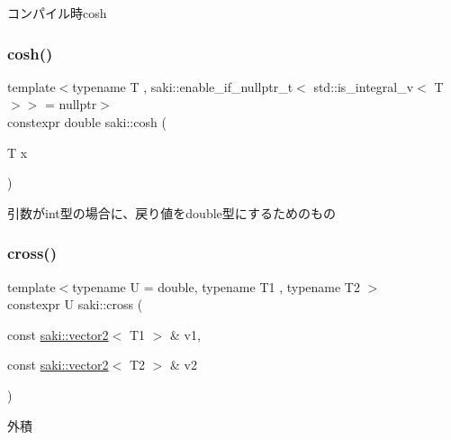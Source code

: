 コンパイル時cosh 

\mbox{\label{namespacesaki_afe248729248030bd5858469409e902d2}} 
\subsubsection{\texorpdfstring{cosh()}{cosh()}\hspace{0.1cm}{\footnotesize\ttfamily [2/2]}}
{\footnotesize\ttfamily template$<$typename T , saki\+::enable\+\_\+if\+\_\+nullptr\+\_\+t$<$ std\+::is\+\_\+integral\+\_\+v$<$ T $>$$>$  = nullptr$>$ \\
constexpr double saki\+::cosh (\begin{DoxyParamCaption}\item[{T}]{x }\end{DoxyParamCaption})}



引数がint型の場合に、戻り値をdouble型にするためのもの 

\mbox{\label{namespacesaki_a457d78ffe360e1d8a78d14ec5dab38f2}} 
\subsubsection{\texorpdfstring{cross()}{cross()}\hspace{0.1cm}{\footnotesize\ttfamily [1/2]}}
{\footnotesize\ttfamily template$<$typename U  = double, typename T1 , typename T2 $>$ \\
constexpr U saki\+::cross (\begin{DoxyParamCaption}\item[{const \mbox{\hyperlink{classsaki_1_1vector2}{saki\+::vector2}}$<$ T1 $>$ \&}]{v1,  }\item[{const \mbox{\hyperlink{classsaki_1_1vector2}{saki\+::vector2}}$<$ T2 $>$ \&}]{v2 }\end{DoxyParamCaption})}



外積 

\mbox{\label{namespacesaki_a980242869d69e47ff8b10335e86ccf6f}} 

